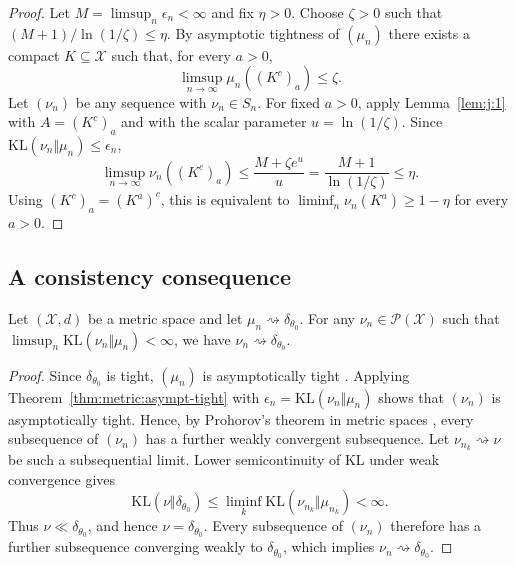 \documentclass[11pt]{article}
\theoremstyle{plain}
\theoremstyle{definition}
\theoremstyle{remark}
\begin{document}
\begin{proof}
Let $M=\limsup_n\epsilon_n<\infty$ and fix $\eta>0$.
Choose $\zeta>0$ such that $(M+1)/\ln(1/\zeta)\le\eta$.
By asymptotic tightness of $(\mu_n)$ there exists a compact $K\subseteq\mathcal X$ such that, for every $a>0$,
\[
\limsup_{n\to\infty} \mu_n\left((K^c)_a\right)\le\zeta.
\]
Let $(\nu_n)$ be any sequence with $\nu_n\in S_n$. For fixed $a>0$, apply Lemma~\ref{lem:j:1} with $A=(K^c)_a$ and with the scalar parameter $u=\ln(1/\zeta)$. Since $\mathrm{KL}(\nu_n\Vert\mu_n)\le\epsilon_n$,
\[
\limsup_{n\to\infty}\nu_n((K^c)_a)\le \frac{M+\zeta e^u}{u}=\frac{M+1}{\ln(1/\zeta)}\le\eta.
\]
Using $(K^c)_a=(K^a)^c$, this is equivalent to $\liminf_n\nu_n(K^a)\ge1-\eta$ for every $a>0$.
\end{proof}




\subsection{A consistency consequence}

\begin{thm}\label{thm:metric:delta}
Let $(\mathcal X,d)$ be a metric space and let $\mu_n\rightsquigarrow\delta_{\theta_0}$.
For any $\nu_n\in\mathcal P(\mathcal X)$ such that $\limsup_n \mathrm{KL}(\nu_n\Vert\mu_n)< \infty$, we have $\nu_n\rightsquigarrow\delta_{\theta_0}$.
\end{thm}

\begin{proof}
Since $\delta_{\theta_0}$ is tight, $(\mu_n)$ is asymptotically tight \cite[Lemma 1.3.8]{vaart2023empirical}.
Applying Theorem~\ref{thm:metric:asympt-tight} with $\epsilon_n=\mathrm{KL}(\nu_n\Vert\mu_n)$ shows that $(\nu_n)$ is asymptotically tight. Hence, by Prohorov's theorem in metric spaces \cite[Thm.~1.3.9]{vaart2023empirical}, every subsequence of $(\nu_n)$ has a further weakly convergent subsequence.
Let $\nu_{n_k}\rightsquigarrow\nu$ be such a subsequential limit. Lower semicontinuity of KL under weak convergence \cite[Thm.~4.9]{polyanskiy_wu_2025_information_theory} gives
\[
\mathrm{KL}(\nu\Vert\delta_{\theta_0}) \le \liminf_k \mathrm{KL}(\nu_{n_k}\Vert\mu_{n_k}) < \infty.
\]
Thus $\nu\ll\delta_{\theta_0}$, and hence $\nu=\delta_{\theta_0}$. Every subsequence of $(\nu_n)$ therefore has a further subsequence converging weakly to $\delta_{\theta_0}$, which implies $\nu_n\rightsquigarrow\delta_{\theta_0}$.
\end{proof}
\end{document}

